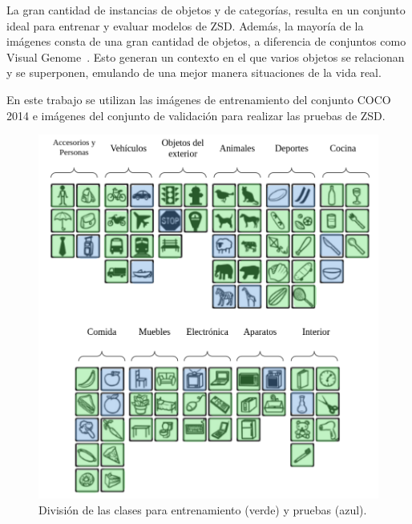 La gran cantidad de instancias de objetos y de categorías, resulta en un conjunto ideal para entrenar y evaluar modelos de ZSD. Además, la mayoría de la imágenes consta de una gran cantidad de objetos, a diferencia de conjuntos como Visual Genome~\cite{krishnavisualgenome}. Esto generan un contexto en el que varios objetos se relacionan y se superponen, emulando de una mejor manera situaciones de la vida real. 

En este trabajo se utilizan las imágenes de entrenamiento del conjunto COCO 2014 e imágenes del conjunto de validación para realizar las pruebas de ZSD.
\begin{figure}
	\begin{center}
		\centering
		\includegraphics[width=1\textwidth]{img/data_set.png}
		\caption{División de las clases para entrenamiento (verde) y pruebas (azul).}
		\label{fig:data_set}
	\end{center}	
\end{figure}

